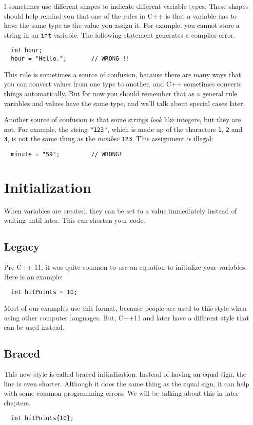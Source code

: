 \vspace{0.1in}
\centerline{}
\vspace{0.1in}

I sometimes use different shapes to indicate different
variable types.  These shapes should help remind you that one of the
rules in C++ is that a variable has to have the same type as the
value you assign it.  For example, you cannot store a string in
an {\tt int} variable.  The following statement generates a compiler
error.

\begin{lstlisting}
  int hour;
  hour = "Hello.";       // WRONG !!
\end{lstlisting}

%
This rule is sometimes a source of confusion, because there are many
ways that you can convert values from one type to another, and C++
sometimes converts things automatically.  But for now you should
remember that as a general rule variables and values have the same
type, and we'll talk about special cases later.

Another source of confusion is that some strings {\em look}
like integers, but they are not.  For example,
the string {\tt "123"}, which is made up of the
characters {\tt 1}, {\tt 2} and {\tt 3}, is not
the same thing as the {\em number} {\tt 123}.
This assignment is illegal:

\begin{lstlisting}
  minute = "59";         // WRONG!
\end{lstlisting}
%
\section{Initialization}
When variables are created, they can be set to a value immediately instead of waiting until later. This can shorten your code. 

\subsection{Legacy}
Pre-C++ 11, it was quite common to use an equation to initialize 
your variables.
Here is an example:
\begin{lstlisting}
  int hitPoints = 10;
\end{lstlisting}
Most of our examples use this format, because people are used to 
this style when using other computer languages. But, C++11 and later
have a different style that can be used instead.
\subsection{Braced}
This new style is called braced initialization. Instead of having an equal sign, the line is even shorter. Although it does the same thing as the equal sign, it can help with some common programming errors. We will be talking about this in later chapters.
\begin{lstlisting}
  int hitPoints{10};
\end{lstlisting}
